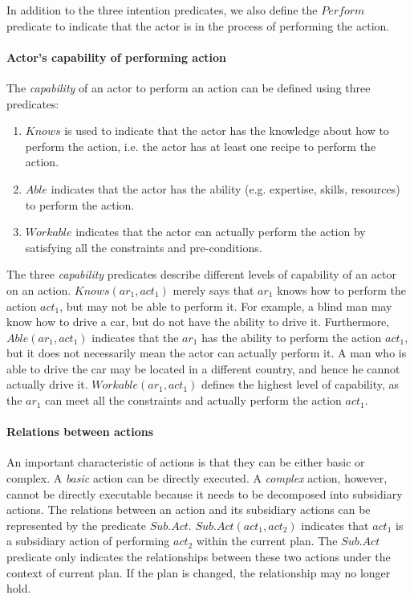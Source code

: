 In addition to the three intention predicates, we also define the $Perform$ predicate to indicate that the actor is in the process of performing the action.


\paragraph*{Actor's capability of performing action} %
\label{par:actor_s_capability_of_performing_action}
The \emph{capability} of an actor to perform an action can be defined using three predicates:
\begin{enumerate}
	\item $Knows$ is used to indicate that the actor has the knowledge about how to perform the action, i.e. the actor has at least one recipe to perform the action.
	\item $Able$ indicates that the actor has the ability (e.g. expertise, skills, resources) to perform the action.
	\item $Workable$ indicates that the actor can actually perform the action by satisfying all the constraints and pre-conditions.
\end{enumerate}

The three \emph{capability} predicates describe different levels of capability of an actor on an action. $Knows(ar_1, act_1)$ merely says that $ar_1$ knows how to perform the action $act_1$, but may not be able to perform it. For example, a blind man may know how to drive a car, but do not have the ability to drive it. Furthermore, $Able(ar_1, act_1)$ indicates that the $ar_1$ has the ability to perform the action $act_1$, but it does not necessarily mean the actor can actually perform it. A man who is able to drive the car may be located in a different country, and hence he cannot actually drive it. $Workable(ar_1, act_1)$ defines the highest level of capability, as the $ar_1$ can meet all the constraints and actually perform the action $act_1$.

\paragraph*{Relations between actions} %
\label{par:relations_between_actions}
An important characteristic of actions is that they can be either basic or complex. A \emph{basic} action can be directly executed. A \emph{complex} action, however, cannot be directly executable because it needs to be decomposed into subsidiary actions. The relations between an action and its subsidiary actions can be represented by the predicate $Sub.Act$. $Sub.Act(act_1, act_2)$ indicates that $act_1$ is a subsidiary action of performing $act_2$ within the current plan. The $Sub.Act$ predicate only indicates the relationships between these two actions under the context of current plan. If the plan is changed, the relationship may no longer hold.

